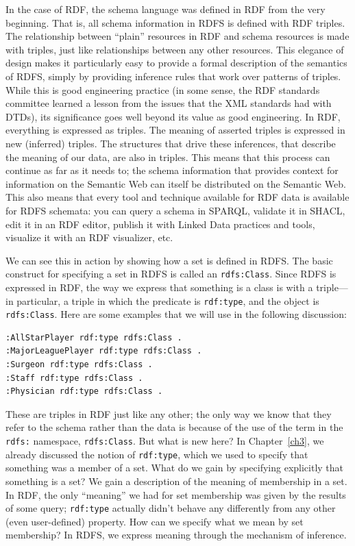 In the case of RDF, the schema language was defined in RDF from the very
beginning. That is, all schema information in RDFS is defined with RDF
triples. The relationship between ``plain'' resources in RDF and schema
resources is made with triples, just like relationships between any
other resources. This elegance of design makes it particularly easy to
provide a formal description of the semantics of RDFS, simply by
providing inference rules that work over patterns of triples. While this
is good engineering practice (in some sense, the RDF standards committee
learned a lesson from the issues that the XML standards had with DTDs),
its significance goes well beyond its value as good engineering. In RDF,
everything is expressed as triples. The meaning of asserted triples is
expressed in new (inferred) triples. The structures that drive these
inferences, that describe the meaning of our data, are also in triples.
This means that this process can continue as far as it needs to; the
schema information that provides context for information on the Semantic
Web can itself be distributed on the Semantic Web. This also means that
every tool and technique available for RDF data is available for RDFS
schemata: you can query a schema in SPARQL, validate it in SHACL, edit
it in an RDF editor, publish it with Linked Data practices and tools,
visualize it with an RDF visualizer, etc.

We can see this in action by showing how a set is defined in RDFS. The
basic construct for specifying a set in RDFS is called an \texttt{rdfs:Class}.
Since RDFS is expressed in RDF, the way we express that something is a
class is with a triple---in particular, a triple in which the predicate
is \texttt{rdf:type}, and the object is \texttt{rdfs:Class}. Here are some examples that
we will use in the following discussion:

\begin{lstlisting}
:AllStarPlayer rdf:type rdfs:Class .
:MajorLeaguePlayer rdf:type rdfs:Class .
:Surgeon rdf:type rdfs:Class .
:Staff rdf:type rdfs:Class .
:Physician rdf:type rdfs:Class .
\end{lstlisting}

These are triples in RDF just like any other; the only way we know that
they refer to the schema rather than the data is because of the use of
the term in the \texttt{rdfs:} namespace, \texttt{rdfs:Class}. But what is new here? In
Chapter~\ref{ch3}, we already discussed the notion of \texttt{rdf:type}, which we used to
specify that something was a member of a set. What do we gain by
specifying explicitly that something is a set? We gain a description of
the meaning of membership in a set. In RDF, the only ``meaning'' we had
for set membership was given by the results of some query; \texttt{rdf:type}
actually didn't behave any differently from any other (even
user-defined) property. How can we specify what we mean by set
membership? In RDFS, we express meaning through the mechanism of
inference.

